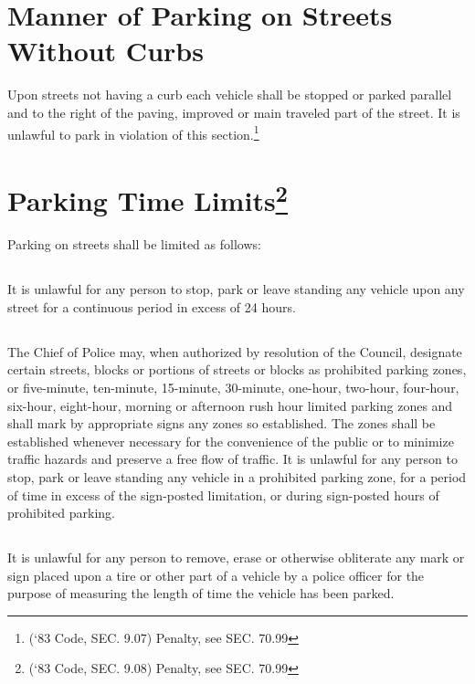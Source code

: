 \section{Manner of Parking on Streets Without Curbs}
Upon streets not having a curb each vehicle shall be stopped or parked parallel and to the right of the paving, improved or main traveled part of the street.  It is unlawful to park in violation of this section.\footnote{(‘83 Code, SEC. 9.07)  Penalty, see SEC. 70.99}

\section{Parking Time Limits\footnote{(‘83 Code, SEC. 9.08)  Penalty, see SEC. 70.99}}
Parking on streets shall be limited as follows:
\subsection{}
It is unlawful for any person to stop, park or leave standing any vehicle upon any street for a continuous period in excess of 24 hours.
\subsection{}
The Chief of Police may, when authorized by resolution of the Council, designate certain streets, blocks or portions of streets or blocks as prohibited parking zones, or five-minute, ten-minute, 15-minute, 30-minute, one-hour, two-hour, four-hour, six-hour, eight-hour, morning or afternoon rush hour limited parking zones and shall mark by appropriate signs any zones so established.  The zones shall be established whenever necessary for the convenience of the public or to minimize traffic hazards and preserve a free flow of traffic.  It is unlawful for any person to stop, park or leave standing any vehicle in a prohibited parking zone, for a period of time in excess of the sign-posted limitation, or during sign-posted hours of prohibited parking.
\subsection{}
It is unlawful for any person to remove, erase or otherwise obliterate any mark or sign placed upon a tire or other part of a vehicle by a police officer for the purpose of measuring the length of time the vehicle has been parked.
